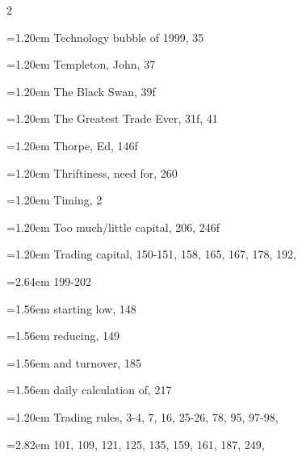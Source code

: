 {\begin{multicols}{2}
\par \noindent\hangindent=1.20em\hspace*{0.00em} Technology bubble of 1999, 35
\par \noindent\hangindent=1.20em\hspace*{0.00em} Templeton, John, 37
\par \noindent\hangindent=1.20em\hspace*{0.00em} The Black Swan, 39f
\par \noindent\hangindent=1.20em\hspace*{0.00em} The Greatest Trade Ever, 31f, 41
\par \noindent\hangindent=1.20em\hspace*{0.00em} Thorpe, Ed, 146f
\par \noindent\hangindent=1.20em\hspace*{0.00em} Thriftiness, need for, 260
\par \noindent\hangindent=1.20em\hspace*{0.00em} Timing, 2
\par \noindent\hangindent=1.20em\hspace*{0.00em} Too much/little capital, 206, 246f
\par \noindent\hangindent=1.20em\hspace*{0.00em} Trading capital, 150-151, 158, 165, 167, 178, 192,
\par \noindent\hangindent=2.64em\hspace*{1.44em} 199-202
\par \noindent\hangindent=1.56em\hspace*{0.36em} starting low, 148
\par \noindent\hangindent=1.56em\hspace*{0.36em} reducing, 149
\par \noindent\hangindent=1.56em\hspace*{0.36em} and turnover, 185
\par \noindent\hangindent=1.56em\hspace*{0.36em} daily calculation of, 217
\par \noindent\hangindent=1.20em\hspace*{0.00em} Trading rules, 3-4, 7, 16, 25-26, 78, 95, 97-98,
\par \noindent\hangindent=2.82em\hspace*{1.62em} 101, 109, 121, 125, 135, 159, 161, 187, 249,

\end{multicols}}

